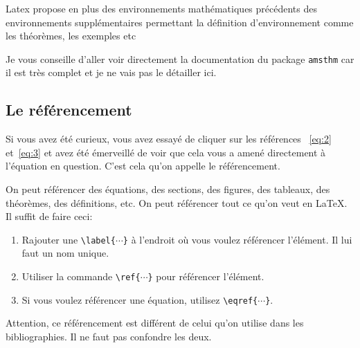 Latex propose en plus des environnements mathématiques précédents des environnements 
supplémentaires permettant la définition d'environnement comme les théorèmes, les exemples etc

Je vous conseille d'aller voir directement la documentation du package \texttt{amsthm}
car il est très complet et je ne vais pas le détailler ici.

\subsection{Le référencement}\label{subsec:latex_math_ref}

Si vous avez été curieux, vous avez essayé de cliquer sur les références
~\eqref{eq:2} et~\eqref{eq:3} et avez été émerveillé de voir que
cela vous a amené directement à l'équation en question.
C'est cela qu'on appelle le référencement.

On peut référencer des équations, des sections, des figures, des tableaux,
des théorèmes, des définitions, etc. On peut référencer tout ce qu'on veut
en LaTeX. Il suffit de faire ceci:
\begin{enumerate}
    \item Rajouter une \texttt{\textbackslash{}label\{\(\cdots\)\}} à l'endroit
    où vous voulez référencer l'élément. Il lui faut un nom unique.
    \item Utiliser la commande \texttt{\textbackslash{}ref\{\(\cdots\)\}} pour
    référencer l'élément.
    \item Si vous voulez référencer une équation, utilisez \texttt{\textbackslash{}eqref\{\(\cdots\)\}}.
\end{enumerate}

Attention, ce référencement est différent de celui qu'on utilise
dans les bibliographies. Il ne faut pas confondre les deux.
